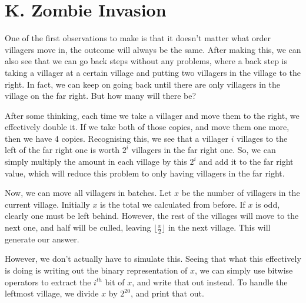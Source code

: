 \section*{K. Zombie Invasion}

One of the first observations to make is that it doesn't matter what order villagers move in, the outcome will always be the same. After making this, we can also see that we can go back steps without any problems, where a back step is taking a villager at a certain village and putting two villagers in the village to the right. In fact, we can keep on going back until there are only villagers in the village on the far right. But how many will there be?

After some thinking, each time we take a villager and move them to the right, we effectively double it. If we take both of those copies, and move them one more, then we have 4 copies. Recognising this, we see that a villager $i$ villages to the left of the far right one is worth $2^i$ villagers in the far right one. So, we can simply multiply the amount in each village by this $2^i$ and add it to the far right value, which will reduce this problem to only having villagers in the far right.

Now, we can move all villagers in batches. Let $x$ be the number of villagers in the current village. Initially $x$ is the total we calculated from before. If $x$ is odd, clearly one must be left behind. However, the rest of the villages will move to the next one, and half will be culled, leaving $\lfloor \frac{x}{2} \rfloor$ in the next village. This will generate our answer.

However, we don't actually have to simulate this. Seeing that what this effectively is doing is writing out the binary representation of $x$, we can simply use bitwise operators to extract the $i^{th}$ bit of $x$, and write that out instead. To handle the leftmost village, we divide $x$ by $2^{20}$, and print that out.